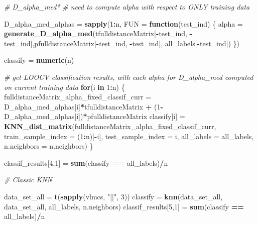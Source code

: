 \documentclass[
]{article}
\newenvironment{Shaded}{\begin{snugshade}}{\end{snugshade}}
\newcommand{\AttributeTok}[1]{\textcolor[rgb]{0.13,0.29,0.53}{#1}}
\newcommand{\CommentTok}[1]{\textcolor[rgb]{0.56,0.35,0.01}{\textit{#1}}}
\newcommand{\ControlFlowTok}[1]{\textcolor[rgb]{0.13,0.29,0.53}{\textbf{#1}}}
\newcommand{\DecValTok}[1]{\textcolor[rgb]{0.00,0.00,0.81}{#1}}
\newcommand{\FunctionTok}[1]{\textcolor[rgb]{0.13,0.29,0.53}{\textbf{#1}}}
\newcommand{\NormalTok}[1]{#1}
\newcommand{\OtherTok}[1]{\textcolor[rgb]{0.56,0.35,0.01}{#1}}
\newcommand{\SpecialCharTok}[1]{\textcolor[rgb]{0.81,0.36,0.00}{\textbf{#1}}}
\newcommand{\StringTok}[1]{\textcolor[rgb]{0.31,0.60,0.02}{#1}}
\begin{document}
\begin{Shaded}
\begin{Highlighting}[]
\CommentTok{\# D\_alpha\_med*}
\CommentTok{\# need to compute alpha with respect to ONLY training data}

\NormalTok{D\_alpha\_med\_alphas }\OtherTok{=} \FunctionTok{sapply}\NormalTok{(}\DecValTok{1}\SpecialCharTok{:}\NormalTok{n, }\AttributeTok{FUN =} \ControlFlowTok{function}\NormalTok{(test\_ind)}
\NormalTok{\{}
\NormalTok{  alpha }\OtherTok{=} \FunctionTok{generate\_D\_alpha\_med}\NormalTok{(tfulldistanceMatrix[}\SpecialCharTok{{-}}\NormalTok{test\_ind, }\SpecialCharTok{{-}}\NormalTok{test\_ind],pfulldistanceMatrix[}\SpecialCharTok{{-}}\NormalTok{test\_ind, }\SpecialCharTok{{-}}\NormalTok{test\_ind], all\_labels[}\SpecialCharTok{{-}}\NormalTok{test\_ind])}
\NormalTok{\})}

\NormalTok{classify }\OtherTok{=} \FunctionTok{numeric}\NormalTok{(n)}

\CommentTok{\# get LOOCV classification results, with each alpha for D\_alpha\_med computed on current training data}
\ControlFlowTok{for}\NormalTok{(i }\ControlFlowTok{in} \DecValTok{1}\SpecialCharTok{:}\NormalTok{n)}
\NormalTok{\{}
\NormalTok{  fulldistanceMatrix\_alpha\_fixed\_classif\_curr }\OtherTok{=}\NormalTok{ D\_alpha\_med\_alphas[i]}\SpecialCharTok{*}\NormalTok{tfulldistanceMatrix }\SpecialCharTok{+}\NormalTok{ (}\DecValTok{1}\SpecialCharTok{{-}}\NormalTok{D\_alpha\_med\_alphas[i])}\SpecialCharTok{*}\NormalTok{pfulldistanceMatrix}
\NormalTok{  classify[i] }\OtherTok{=} \FunctionTok{KNN\_dist\_matrix}\NormalTok{(fulldistanceMatrix\_alpha\_fixed\_classif\_curr,}
                                \AttributeTok{train\_sample\_index =}\NormalTok{ (}\DecValTok{1}\SpecialCharTok{:}\NormalTok{n)[}\SpecialCharTok{{-}}\NormalTok{i], }
                                \AttributeTok{test\_sample\_index =}\NormalTok{ i,  }
                                \AttributeTok{all\_labels =}\NormalTok{ all\_labels, }
                                \AttributeTok{n.neighbors =}\NormalTok{ n.neighbors)}
\NormalTok{\}}

\NormalTok{classif\_results[}\DecValTok{4}\NormalTok{,}\DecValTok{1}\NormalTok{] }\OtherTok{=} \FunctionTok{sum}\NormalTok{(classify }\SpecialCharTok{==}\NormalTok{ all\_labels)}\SpecialCharTok{/}\NormalTok{n}

\CommentTok{\# Classic KNN }

\NormalTok{data\_set\_all }\OtherTok{=} \FunctionTok{t}\NormalTok{(}\FunctionTok{sapply}\NormalTok{(vlmcs, }\StringTok{"[["}\NormalTok{, }\DecValTok{3}\NormalTok{))}
\NormalTok{classify }\OtherTok{=} \FunctionTok{knn}\NormalTok{(data\_set\_all, data\_set\_all, all\_labels, n.neighbors)}
\NormalTok{classif\_results[}\DecValTok{5}\NormalTok{,}\DecValTok{1}\NormalTok{] }\OtherTok{=} \FunctionTok{sum}\NormalTok{(classify }\SpecialCharTok{==}\NormalTok{ all\_labels)}\SpecialCharTok{/}\NormalTok{n}
\end{Highlighting}
\end{Shaded}
\end{document}
